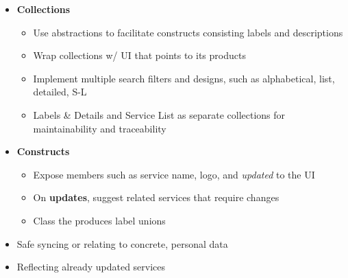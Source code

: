 \documentclass[7px]{article}
\begin{document}
{
  \begin{itemize}[label=\textsection]
    \normalsize
    \item {\textbf{Collections}}
      \small
      \begin{itemize}[label=$\multimapdotinv$, leftmargin=3mm]
        \item Use abstractions to facilitate constructs consisting labels and descriptions
        \item Wrap collections w/ UI that points to its products
        \item Implement multiple search filters and designs, such as alphabetical, list, detailed, S-L
        \item Labels \& Details and Service List as separate collections for maintainability and traceability
      \end{itemize}
      \normalsize
    \item {\textbf{Constructs}}
      \small
      \begin{itemize}[label=$\multimapdotinv$, leftmargin=3mm]
        \item Expose members such as service name, logo, and \textsl{updated} to the UI 
        \item On \textbf{updates}, suggest related services that require changes
        \item[$\Diamonddot$] \textcolor[HTML]{F5BB00}{Class the produces label unions}
      \end{itemize}
      \normalsize
  \end{itemize}
}
{
  \raggedright
  \begin{itemize}[label=\blitzb]
    \small
    \item Safe syncing or relating to concrete, personal data
    \item Reflecting already updated services
  \end{itemize}
}
\end{document}
